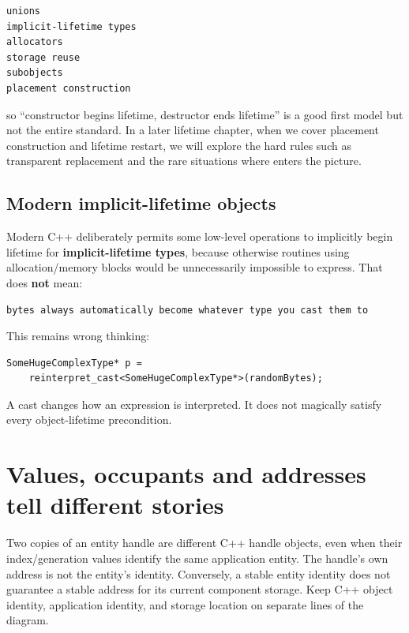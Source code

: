 \begin{verbatim}
unions
implicit-lifetime types
allocators
storage reuse
subobjects
placement construction
\end{verbatim}

so ``constructor begins lifetime, destructor ends lifetime'' is a good first model but not the entire standard. In a later lifetime chapter, when we cover placement construction and lifetime restart, we will explore the hard rules such as transparent replacement and the rare situations where  enters the picture.

\subsection{Modern implicit-lifetime objects}\label{05-engine-i-ch002-modern-implicit-lifetime-objects}

\hypertarget{05-engine-i-ch002-modern-implicit-lifetime-objects}{}

Modern C++ deliberately permits some low-level operations to implicitly begin lifetime for \textbf{implicit-lifetime types}, because otherwise routines using allocation/memory blocks would be unnecessarily impossible to express. That does \textbf{not} mean:

\begin{verbatim}
bytes always automatically become whatever type you cast them to
\end{verbatim}

This remains wrong thinking:

\begin{verbatim}
SomeHugeComplexType* p =
    reinterpret_cast<SomeHugeComplexType*>(randomBytes);
\end{verbatim}

A cast changes how an expression is interpreted. It does not magically satisfy every object-lifetime precondition.

\section{Values, occupants and addresses tell different stories}\label{05-engine-i-ch002-values-occupants-and-addresses-tell-different-stories}

\hypertarget{05-engine-i-ch002-values-occupants-and-addresses-tell-different-stories}{}

Two copies of an entity handle are different C++ handle objects, even when their index/generation values identify the same application entity. The handle's own address is not the entity's identity. Conversely, a stable entity identity does not guarantee a stable address for its current component storage. Keep C++ object identity, application identity, and storage location on separate lines of the diagram.

